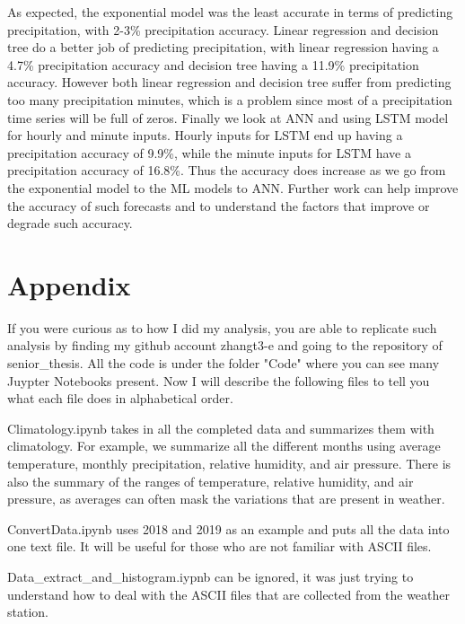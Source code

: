\documentclass[11pt]{report}
\begin{document}
As expected, the exponential model was the least accurate in terms of predicting precipitation, with 2-3\% precipitation accuracy. Linear regression and decision tree do a better job of predicting precipitation, with linear regression having a 4.7\% precipitation accuracy and decision tree having a 11.9\% precipitation accuracy. However both linear regression and decision tree suffer from predicting too many precipitation minutes, which is a problem since most of a precipitation time series will be full of zeros. Finally we look at ANN and using LSTM model for hourly and minute inputs. Hourly inputs for LSTM end up having a precipitation accuracy of 9.9\%, while the minute inputs for LSTM have a precipitation accuracy of 16.8\%. Thus the accuracy does increase as we go from the exponential model to the ML models to ANN. Further work can help improve the accuracy of such forecasts and to understand the factors that improve or degrade such accuracy. 
\small
\renewcommand{\bibsep}{0em}

\renewcommand{\bibname}{References}



\clearpage

	\section{Appendix} 
	If you were curious as to how I did my analysis, you are able to replicate such analysis by finding my github account zhangt3-e and going to the repository of senior\_thesis. All the code is under the folder "Code" where you can see many Juypter Notebooks present. Now I will describe the following files to tell you what each file does in alphabetical order. 
	
	Climatology.ipynb takes in all the completed data and summarizes them with climatology. For example, we summarize all the different months using average temperature, monthly precipitation, relative humidity, and air pressure. There is also the summary of the ranges of temperature, relative humidity, and air pressure, as averages can often mask the variations that are present in weather. 
	
	ConvertData.ipynb uses 2018 and 2019 as an example and puts all the data into one text file. It will be useful for those who are not familiar with ASCII files. 
	
	Data\_extract\_and\_histogram.iypnb can be ignored, it was just trying to understand how to deal with the ASCII files that are collected from the weather station. 
	
\end{document}
